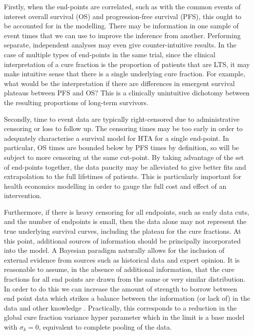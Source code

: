 \documentclass[AMA,STIX1COL]{WileyNJD-v2}
\begin{document}
Firstly, when the end-points are correlated, such as with the common events of interest overall survival (OS) and progression-free survival (PFS), this ought to be accounted for in the modelling.
There may be information in one sample of event times that we can use to improve the inference from another.
Performing separate, independent analyses may even give counter-intuitive results.
In the case of multiple types of end-points in the same trial, since the clinical interpretation of a cure fraction is the proportion of patients that are LTS,
it may make intuitive sense that there is a single underlying cure fraction.
For example, what would be the interpretation if there are differences in emergent survival plateaus between PFS and OS?
This is a clinically unintuitive dichotomy between the resulting proportions of long-term survivors.

Secondly, time to event data are typically right-censored due to administrative censoring or loss to follow up.
The censoring times may be too early in order to adequately characterise a survival model for HTA for a single end-point.
In particular, OS times are bounded below by PFS times by definition, so will be subject to more censoring at the same cut-point.
By taking advantage of the set of end-points together, the data paucity may be alleviated to give better fits and extrapolation to the full lifetimes of patients.
This is particularly important for health economics modelling in order to gauge the full cost and effect of an intervention.

Furthermore, if there is heavy censoring for all endpoints, such as early data cuts, and the number of endpoints is small, then the data alone may not represent the true underlying survival curves, including the plateau for the cure fractions.
At this point, additional sources of information should be principally incorporated into the model. A Bayesian paradigm naturally allows for the inclusion of external evidence from sources such as historical data and expert opinion. It is reasonable to assume, in the absence of additional information, that the cure fractions for all end points are drawn from the same or very similar distribution. In order to do this we can increase the amount of strength to borrow between end point data which strikes a balance between the information (or lack of) in the data and other knowledge \cite{Nikolaidis2021}. Practically, this corresponds to a reduction in the global cure fraction variance hyper parameter which in the limit is a base model with $\sigma_k=0$, equivalent to complete pooling of the data. 
\end{document}
